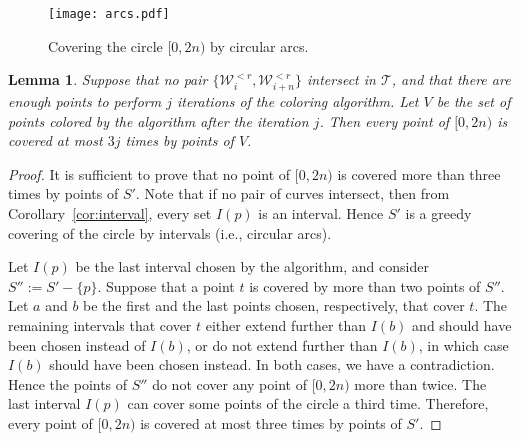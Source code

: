 \documentclass[english,11pt]{article}
\newtheorem{lemma}{Lemma}
\newcommand{\bigt}{\mathcal T}
\newcommand{\bigw}{\mathcal W}
\begin{document}
\begin{figure}[htb]
\begin{center}
\texttt{[image: arcs.pdf]}
\end{center}
\caption{\label{fig:arcs}Covering the circle $[0,2n)$ by circular arcs.}
\end{figure}

\begin{lemma}
\label{lem:coloring}
Suppose that no pair $\{\bigw_i^{<r}, \bigw_{i{+}n}^{<r}\}$ intersect in $\bigt$, and that there are enough points to perform $j$ iterations of the coloring algorithm. Let $V$ be the set of points colored by the algorithm after the iteration $j$. Then every point of $[0, 2n)$ is covered at most $3j$ times by points of $V$.
\end{lemma}
\begin{proof}
It is sufficient to prove that no point of $[0,2n)$ is covered more than three times by points of $S'$.
Note that if no pair of curves intersect, then from Corollary~\ref{cor:interval}, every set $I(p)$ is an interval. Hence $S'$ is a greedy covering of the circle by intervals (i.e., circular arcs).

Let $I(p)$ be the last interval chosen by the algorithm, and consider $S'' := S'{-}\{p\}$. Suppose that a point $t$ is covered by more than two points of $S''$. Let $a$ and $b$ be the first and the last points chosen, respectively, that cover $t$. The remaining intervals that cover $t$ either extend further than $I(b)$ and should have been chosen instead of $I(b)$, or do not extend further than $I(b)$, in which case $I(b)$ should have been chosen instead. In both cases, we have a contradiction. Hence the points of $S''$ do not cover any point of $[0,2n)$ more than twice. The last interval $I(p)$ can cover some points of the circle a third time. Therefore, every point of $[0,2n)$ is covered at most three times by points of $S'$.
\end{proof}
\end{document}
